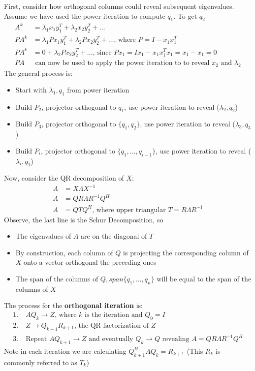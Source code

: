 \documentclass{article}
\begin{document}
First, consider how orthogonal columns could reveal subsequent eigenvalues. Assume we have used the power iteration to compute $q_1$. To get $q_2$
\begin{align*}
    A^k &= \lambda_1x_1y_1^T + \lambda_2x_2y_2^T + \dots\\
    PA^k &= \lambda_1Px_1y_1^T + \lambda_2Px_2y_2^T + \dots \textrm{, where } P = I - x_1x_1^T\\
    PA^k &= 0 + \lambda_2Px_2y_2^T + \dots \textrm{, since } Px_1 = Ix_1 - x_1x_1^Tx_1 = x_1 - x_1 = 0\\
    PA &\textrm{ can now be used to apply the power iteration to to reveal $x_2$ and $\lambda_2$}
\end{align*}
The general process is:
\begin{itemize}
    \item Start with $\lambda_1, q_1$ from power iteration
    \item Build $P_2$, projector orthogonal to $q_1$, use power iteration to reveal ($\lambda_2, q_2$)
    \item Build $P_3$, projector orthogonal to $\{q_1, q_2\}$, use power iteration to reveal ($\lambda_3, q_3$)
    \item Build $P_i$, projector orthogonal to $\{q_1, \dots, q_{i-1}\}$, use power iteration to reveal ($\lambda_i, q_1$)
\end{itemize}
Now, consider the QR decomposition of $X$:
\begin{align*}
    A &= X\Lambda X^{-1}\\
    A &= QR \Lambda R^{-1} Q^H\\
    A &= QTQ^H \textrm{, where upper triangular } T = R\Lambda R^{-1}
\end{align*}
Observe, the last line is the Schur Decomposition, so
\begin{itemize}
    \item The eigenvalues of $A$ are on the diagonal of $T$
    \item By construction, each column of $Q$ is projecting the corresponding column of $X$ onto a vector orthogonal the preceding ones
    \item The span of the columns of $Q, span\{q_1, \dots, q_n\}$ will be equal to the span of the columns of $X$
\end{itemize}
The process for the \textbf{orthogonal iteration} is:
\begin{align*}
    1. \;& AQ_k \rightarrow Z \textrm{, where $k$ is the iteration and } Q_0 = I\\
    2. \;& Z \rightarrow Q_{k+1}R_{k+1} \textrm{, the QR factorization of $Z$}\\
    3. \;& \textrm{Repeat } AQ_{k+1} \rightarrow Z \textrm{ and eventually } Q_k \rightarrow Q \textrm{ revealing } A = QR\Lambda R^{-1}Q^H
\end{align*}
Note in each iteration we are calculating $Q_{k+1}^HAQ_k = R_{k+1}$ (This $R_{k}$ is commonly referred to as $T_k$) 
\end{document}
